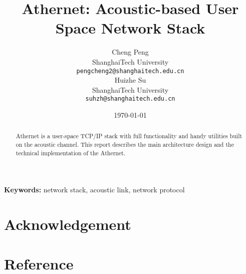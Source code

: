 \documentclass[10pt]{article}
\title{Athernet: Acoustic-based User Space Network Stack}
\author{
  Cheng Peng \\
   ShanghaiTech University   \\
  {\tt pengcheng2@shanghaitech.edu.cn} \\\And
 Huizhe Su \\
   ShanghaiTech University  \\
  {\tt suhzh@shanghaitech.edu.cn} \\}
\date{\today}
\begin{document}
\maketitle
\begin{abstract}
  Athernet is a user-space TCP/IP stack with full functionality and handy utilities built on the acoustic channel. This report describes the main architecture design and the technical implementation of the Athernet.
\end{abstract}

{\bf Keywords:} network stack, acoustic link, network protocol












\section*{Acknowledgement}
\lipsum[22]
\section*{Reference}
\lipsum[23]
% 
\end{document}
